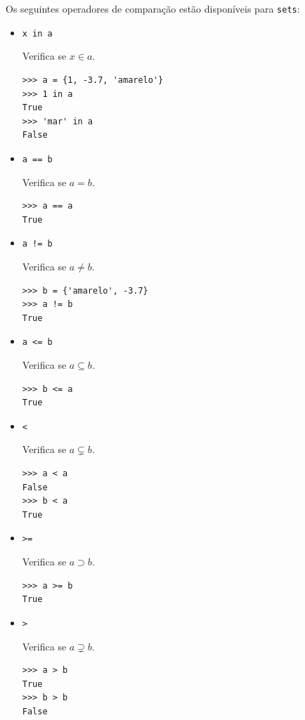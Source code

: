 Os seguintes operadores de comparação estão disponíveis para \lstinline+sets+:
\begin{itemize}
\item \lstinline+x in a+ 

  Verifica se $x\in a$.

\begin{lstlisting}[framexrightmargin=-2.5em]
>>> a = {1, -3.7, 'amarelo'}
>>> 1 in a
True
>>> 'mar' in a
False
\end{lstlisting}

\item \lstinline+a == b+ 

  Verifica se $a = b$.

\begin{lstlisting}[framexrightmargin=-2.5em]
>>> a == a
True
\end{lstlisting}

\item \lstinline+a != b+ 

  Verifica se $a \neq b$.

\begin{lstlisting}[framexrightmargin=-2.5em]
>>> b = {'amarelo', -3.7}
>>> a != b
True
\end{lstlisting}
  
\item \lstinline+a <= b+ 

  Verifica se $a \subseteq b$.

\begin{lstlisting}[framexrightmargin=-2.5em]
>>> b <= a
True
\end{lstlisting}

\item \lstinline+<+ 

  Verifica se $a\subsetneq b$.

\begin{lstlisting}[framexrightmargin=-2.5em]
>>> a < a
False
>>> b < a
True
\end{lstlisting}

\item \lstinline+>=+ 

    Verifica se $a\supset b$.

\begin{lstlisting}[framexrightmargin=-2.5em]
>>> a >= b
True
\end{lstlisting}

\item \lstinline+>+ 

  Verifica se $a\supsetneq b$.
  
\begin{lstlisting}[framexrightmargin=-2.5em]
>>> a > b
True
>>> b > b
False
\end{lstlisting}
\end{itemize}



